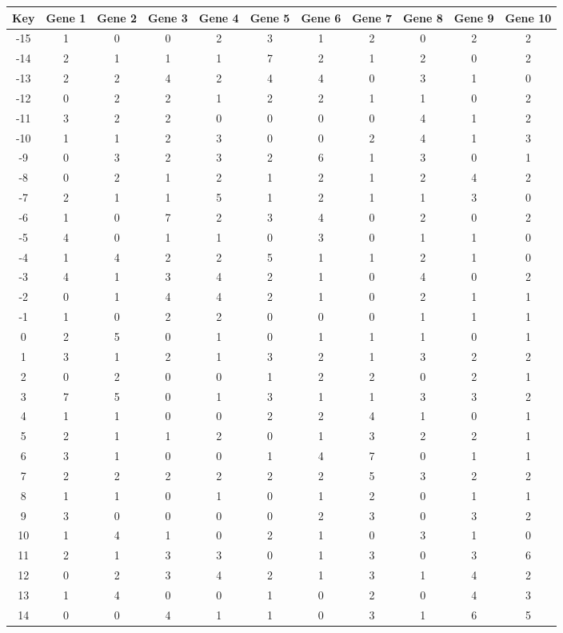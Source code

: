 \begin{tabular}{|c|c|c|c|c|c|c|c|c|c|c|}
\hline
Key & Gene 1 & Gene 2 & Gene 3 & Gene 4 & Gene 5 & Gene 6 & Gene 7 & Gene 8 & Gene 9 & Gene 10 \\
\hline
-15 & 1 & 0 & 0 & 2 & 3 & 1 & 2 & 0 & 2 & 2 \\
-14 & 2 & 1 & 1 & 1 & 7 & 2 & 1 & 2 & 0 & 2 \\
-13 & 2 & 2 & 4 & 2 & 4 & 4 & 0 & 3 & 1 & 0 \\
-12 & 0 & 2 & 2 & 1 & 2 & 2 & 1 & 1 & 0 & 2 \\
-11 & 3 & 2 & 2 & 0 & 0 & 0 & 0 & 4 & 1 & 2 \\
-10 & 1 & 1 & 2 & 3 & 0 & 0 & 2 & 4 & 1 & 3 \\
-9 & 0 & 3 & 2 & 3 & 2 & 6 & 1 & 3 & 0 & 1 \\
-8 & 0 & 2 & 1 & 2 & 1 & 2 & 1 & 2 & 4 & 2 \\
-7 & 2 & 1 & 1 & 5 & 1 & 2 & 1 & 1 & 3 & 0 \\
-6 & 1 & 0 & 7 & 2 & 3 & 4 & 0 & 2 & 0 & 2 \\
-5 & 4 & 0 & 1 & 1 & 0 & 3 & 0 & 1 & 1 & 0 \\
-4 & 1 & 4 & 2 & 2 & 5 & 1 & 1 & 2 & 1 & 0 \\
-3 & 4 & 1 & 3 & 4 & 2 & 1 & 0 & 4 & 0 & 2 \\
-2 & 0 & 1 & 4 & 4 & 2 & 1 & 0 & 2 & 1 & 1 \\
-1 & 1 & 0 & 2 & 2 & 0 & 0 & 0 & 1 & 1 & 1 \\
0 & 2 & 5 & 0 & 1 & 0 & 1 & 1 & 1 & 0 & 1 \\
1 & 3 & 1 & 2 & 1 & 3 & 2 & 1 & 3 & 2 & 2 \\
2 & 0 & 2 & 0 & 0 & 1 & 2 & 2 & 0 & 2 & 1 \\
3 & 7 & 5 & 0 & 1 & 3 & 1 & 1 & 3 & 3 & 2 \\
4 & 1 & 1 & 0 & 0 & 2 & 2 & 4 & 1 & 0 & 1 \\
5 & 2 & 1 & 1 & 2 & 0 & 1 & 3 & 2 & 2 & 1 \\
6 & 3 & 1 & 0 & 0 & 1 & 4 & 7 & 0 & 1 & 1 \\
7 & 2 & 2 & 2 & 2 & 2 & 2 & 5 & 3 & 2 & 2 \\
8 & 1 & 1 & 0 & 1 & 0 & 1 & 2 & 0 & 1 & 1 \\
9 & 3 & 0 & 0 & 0 & 0 & 2 & 3 & 0 & 3 & 2 \\
10 & 1 & 4 & 1 & 0 & 2 & 1 & 0 & 3 & 1 & 0 \\
11 & 2 & 1 & 3 & 3 & 0 & 1 & 3 & 0 & 3 & 6 \\
12 & 0 & 2 & 3 & 4 & 2 & 1 & 3 & 1 & 4 & 2 \\
13 & 1 & 4 & 0 & 0 & 1 & 0 & 2 & 0 & 4 & 3 \\
14 & 0 & 0 & 4 & 1 & 1 & 0 & 3 & 1 & 6 & 5 \\
\hline
\end{tabular}